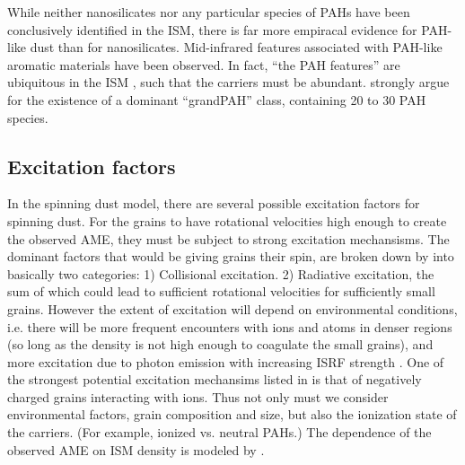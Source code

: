     While neither nanosilicates nor any particular species of PAHs have been conclusively identified in the ISM, there is far more empiracal evidence for PAH-like dust than for nanosilicates. Mid-infrared features associated with PAH-like aromatic materials have been observed. In fact, ``the PAH features'' are ubiquitous in the ISM \citep{giard94,onaka96,onaka00}, such that the carriers must be abundant. \cite{andrews15} strongly argue for the  existence of a dominant ``grandPAH'' class, containing 20 to 30 PAH species.

     \subsection{Excitation factors}
       In the spinning dust model, there are several possible excitation factors for spinning dust. For the grains to have rotational velocities high enough to create the observed AME, they must be subject to strong excitation mechansisms. The dominant factors that would be giving grains their spin, are broken down by \cite{draine11} into basically two categories: 1) Collisional excitation. 2) Radiative excitation, the sum of which could lead to sufficient rotational velocities for sufficiently small grains. However the extent of excitation will depend on environmental conditions, i.e. there will be more frequent encounters with ions and atoms in denser regions (so long as the density is not high enough to coagulate the small grains), and more excitation due to photon emission with increasing ISRF strength \citep{ali-haimoud09, ali-haimoud14}. One of the strongest potential excitation mechansims listed in \cite{draine11} is that of negatively charged grains interacting with ions. Thus not only must we consider environmental factors, grain composition and size, but also the ionization state of the carriers. (For example, ionized vs. neutral PAHs.) The dependence of the observed AME on ISM density is modeled by \cite{ali-haimoud10}.

